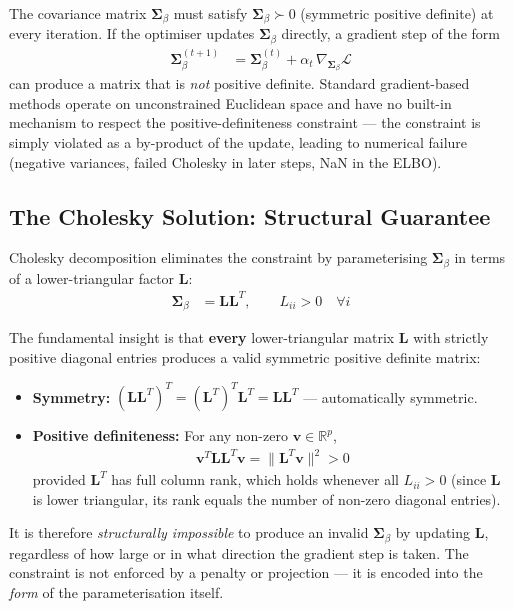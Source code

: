 \documentclass[11pt]{article}
\newcommand{\R}{\mathbb{R}}
\begin{document}
The covariance matrix $\bm{\Sigma}_\beta$ must satisfy $\bm{\Sigma}_\beta \succ 0$ (symmetric positive definite) at every iteration. If the optimiser updates $\bm{\Sigma}_\beta$ directly, a gradient step of the form
\begin{align}
  \bm{\Sigma}_\beta^{(t+1)} &= \bm{\Sigma}_\beta^{(t)} + \alpha_t \,\nabla_{\bm{\Sigma}_\beta}\mathcal{L}
\end{align}
can produce a matrix that is \emph{not} positive definite. Standard gradient-based methods operate on unconstrained Euclidean space and have no built-in mechanism to respect the positive-definiteness constraint --- the constraint is simply violated as a by-product of the update, leading to numerical failure (negative variances, failed Cholesky in later steps, NaN in the ELBO).

\subsection*{The Cholesky Solution: Structural Guarantee}

Cholesky decomposition eliminates the constraint by parameterising $\bm{\Sigma}_\beta$ in terms of a lower-triangular factor $\bm{L}$:
\begin{align}
  \bm{\Sigma}_\beta &= \bm{L}\bm{L}^T, \qquad L_{ii} > 0 \quad \forall i
\end{align}

The fundamental insight is that \textbf{every} lower-triangular matrix $\bm{L}$ with strictly positive diagonal entries produces a valid symmetric positive definite matrix:

\begin{itemize}
  \item \textbf{Symmetry:} $(\bm{L}\bm{L}^T)^T = (\bm{L}^T)^T\bm{L}^T = \bm{L}\bm{L}^T$ \quad --- automatically symmetric.
  \item \textbf{Positive definiteness:} For any non-zero $\bm{v} \in \R^p$,
  \begin{align}
    \bm{v}^T \bm{L}\bm{L}^T \bm{v} = \|\bm{L}^T\bm{v}\|^2 > 0
  \end{align}
  provided $\bm{L}^T$ has full column rank, which holds whenever all $L_{ii} > 0$ (since $\bm{L}$ is lower triangular, its rank equals the number of non-zero diagonal entries).
\end{itemize}

It is therefore \emph{structurally impossible} to produce an invalid $\bm{\Sigma}_\beta$ by updating $\bm{L}$, regardless of how large or in what direction the gradient step is taken. The constraint is not enforced by a penalty or projection --- it is encoded into the \emph{form} of the parameterisation itself.
\end{document}
